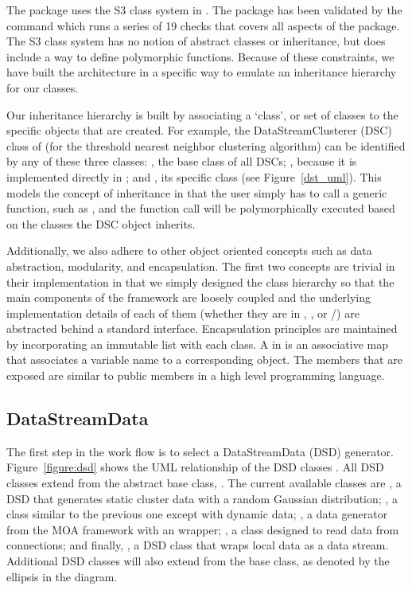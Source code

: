 \documentclass[nojss]{jss}
\begin{document}
The  package uses the S3 class system in . The package has been validated by the command  which runs a series of 19 checks that covers all aspects of the package. The S3 class system has no notion of abstract classes or inheritance, but does include a way to define polymorphic functions. Because of these constraints, we have built the  architecture in a specific way to emulate an inheritance hierarchy for our classes. 


Our inheritance hierarchy is built by associating a `class', or set of classes to the specific objects that are created. For example, the DataStreamClusterer (DSC) class of  (for the threshold nearest neighbor clustering algorithm) can be identified by any of these three classes: , the base class of all DSCs; , because it is implemented directly in ; and , its specific class (see Figure~\ref{dst_uml}). This models the concept of inheritance in that the user simply has to call a generic function, such as , and the function call will be polymorphically executed based on the classes the DSC object inherits. 


Additionally, we also adhere to other object oriented concepts such as data abstraction, modularity, and encapsulation. The first two concepts are trivial in their implementation in that we simply designed the class hierarchy so that the main components of the framework are loosely coupled and the underlying implementation details of each of them (whether they are in , , or /) are abstracted behind a standard interface. Encapsulation principles are maintained by incorporating an immutable  list with each class. A  in  is an associative map that associates a variable name to a corresponding object. The  members that are exposed are similar to public members in a high level programming language.

\subsection{DataStreamData}
\label{sec:design:dsd}

The first step in the  work flow is to select a DataStreamData (DSD) generator. Figure~\ref{figure:dsd} shows the UML relationship of the DSD classes \citep{stream:Fowler:2003}. All DSD classes extend from the abstract base class, . The current available classes are , a DSD that generates static cluster data with a random Gaussian distribution; , a class similar to the previous one except with dynamic data; , a data generator from the MOA framework with an  wrapper; , a class designed to read data from  connections; and finally, , a DSD class that wraps local  data as a data stream. Additional DSD classes will also extend from the base class, as denoted by the ellipsis in the diagram.
\end{document}
